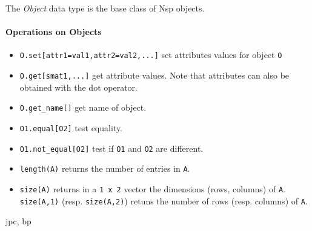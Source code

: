 
\begin{mandesc}
\end{mandesc}

\begin{mandescription}
The \emph{Object} data type is the base class of Nsp objects. 
\end{mandescription}

\paragraph{Operations on Objects}
\begin{itemize}
\item \verb+O.set[attr1=val1,attr2=val2,...]+  set attributes values for object \verb+O+ 
\item \verb+O.get[smat1,...]+ get attribute values. Note that attributes can also be obtained with the dot
  operator. 
\item \verb+O.get_name[]+ get name of object. 
\item \verb+O1.equal[O2]+ test equality. 
\item \verb+O1.not_equal[O2]+ test if \verb!O1! and \verb!O2! are different.
\end{itemize}

\begin{itemize}
\item \verb+length(A)+ returns the number of entries in \verb+A+.
\item \verb+size(A)+ returns in a \verb+1 x 2+ vector the dimensions (rows, columns)
  of \verb+A+. \verb+size(A,1)+ (resp. \verb+size(A,2)+) retuns the number of rows 
  (resp. columns) of \verb+A+.
\end{itemize}

\begin{manseealso}

\end{manseealso}

\begin{authors}
   jpc, bp
\end{authors}

